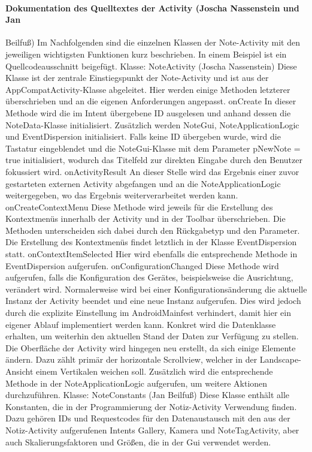 \paragraph{Dokumentation des Quelltextes der Activity (Joscha Nassenstein und Jan} Beilfuß)
Im Nachfolgenden sind die einzelnen Klassen der Note-Activity mit den jeweiligen wichtigsten Funktionen kurz beschrieben. In einem Beispiel ist ein Quellcodeausschnitt beigefügt.
Klasse: NoteActivity (Joscha Nassenstein)
Diese Klasse ist der zentrale Einstiegspunkt der Note-Activity und ist aus der AppCompatActivity-Klasse abgeleitet. Hier werden einige Methoden letzterer überschrieben und an die eigenen Anforderungen angepasst.
onCreate
In dieser Methode wird die im Intent übergebene ID ausgelesen und anhand dessen die NoteData-Klasse initialisiert. Zusätzlich werden NoteGui, NoteApplicationLogic und EventDispersion initialisiert. Falls keine ID übergeben wurde, wird die Tastatur eingeblendet und die NoteGui-Klasse mit dem Parameter pNewNote = true initialisiert, wodurch das Titelfeld zur direkten Eingabe durch den Benutzer fokussiert wird.
onActivityResult
An dieser Stelle wird das Ergebnis einer zuvor gestarteten externen Activity abgefangen und an die NoteApplicationLogic weitergegeben, wo das Ergebnis weiterverarbeitet werden kann.
onCreateContextMenu
Diese Methode wird jeweils für die Erstellung des Kontextmenüs innerhalb der Activity und in der Toolbar überschrieben. Die Methoden unterscheiden sich dabei durch den Rückgabetyp und den Parameter. Die Erstellung des Kontextmenüs findet letztlich in der Klasse EventDispersion statt.
onContextItemSelected
Hier wird ebenfalls die entsprechende Methode in EventDispersion aufgerufen.
onConfigurationChanged
Diese Methode wird aufgerufen, falls die Konfiguration des Gerätes, beispielsweise die Ausrichtung, verändert wird. Normalerweise wird bei einer Konfigurationsänderung die aktuelle Instanz der Activity beendet und eine neue Instanz aufgerufen. Dies wird jedoch durch die explizite  Einstellung im AndroidMainfest verhindert, damit hier ein eigener Ablauf implementiert werden kann. Konkret wird die Datenklasse erhalten, um weiterhin den aktuellen Stand der Daten zur Verfügung zu stellen. Die Oberfläche der Activity wird hingegen neu erstellt, da sich einige Elemente ändern. Dazu zählt primär der horizontale Scrollview, welcher in der Landscape-Ansicht einem Vertikalen weichen soll. Zusätzlich wird die entsprechende Methode in der NoteApplicationLogic aufgerufen, um weitere Aktionen durchzuführen.
Klasse: NoteConstants (Jan Beilfuß) 
Diese Klasse enthält alle Konstanten, die in der Programmierung der Notiz-Activity Verwendung finden. Dazu gehören IDs und Requestcodes für den Datenaustausch mit den aus der Notiz-Activity aufgerufenen Intents Gallery, Kamera und NoteTagActivity, aber auch Skalierungsfaktoren und Größen, die in der Gui verwendet werden.
